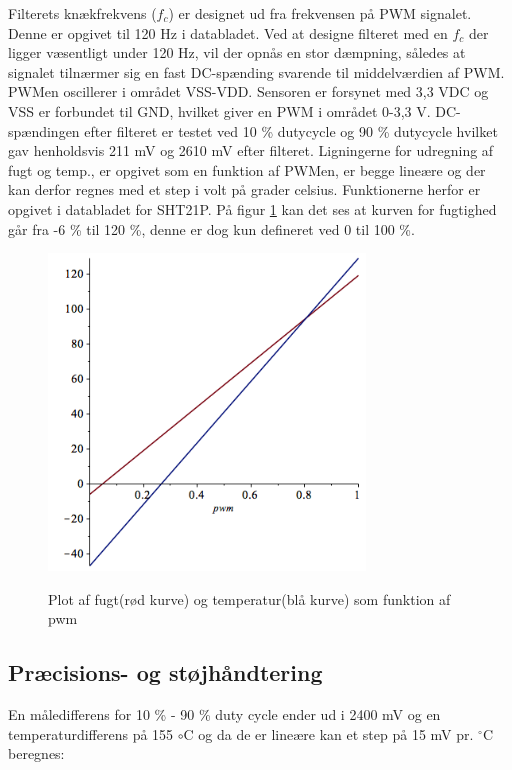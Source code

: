 Filterets knækfrekvens ($f_c$) er designet ud fra frekvensen på PWM signalet. Denne er opgivet til 120 Hz i databladet. Ved at designe filteret med en $f_c$ der ligger væsentligt under 120 Hz, vil der opnås en stor dæmpning, således at signalet tilnærmer sig en fast DC-spænding svarende til middelværdien af PWM. PWMen oscillerer i området VSS-VDD. Sensoren er forsynet med 3,3 VDC og VSS er forbundet til GND, hvilket giver en PWM i området 0-3,3 V. DC-spændingen efter filteret er testet ved 10 \% dutycycle og 90 \% dutycycle hvilket gav henholdsvis 211 mV og 2610 mV efter filteret. Ligningerne for udregning af fugt og temp., er opgivet som en funktion af PWMen, er begge lineære og der kan derfor regnes med et step i volt på grader celsius. Funktionerne herfor er opgivet i databladet for SHT21P. 
På figur \ref{lab:sht_plot_mable} kan det ses at kurven for fugtighed går fra -6 \% til 120 \%, denne er dog kun defineret ved 0 til 100 \%. 

\begin{figure}[htb]
\centering
{\includegraphics[width=0.75\textwidth]{filer/design/Billeder/sht_plot_maple.png}}
\caption{Plot af fugt(rød kurve) og temperatur(blå kurve) som funktion af pwm}
\label{lab:sht_plot_mable}
\end{figure}

\subsection{Præcisions- og støjhåndtering}
En måledifferens for 10 \% - 90 \% duty cycle ender ud i 2400 mV og en temperaturdifferens på 155 ${\circ}$C og da de er lineære kan et step på 15 mV pr. $^{\circ}$C beregnes:

